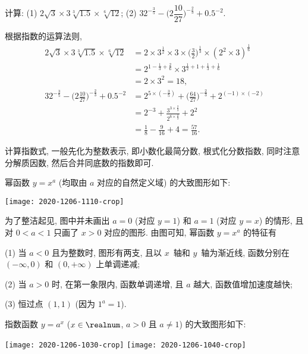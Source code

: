 \begin{example}
    计算: 
    (1) $2\sqrt{3}\times 3\sqrt[3]{1.5}\times \sqrt[6]{12}$;\qquad
    (2) $32^{-\frac35}- \biggl(2\dfrac{10}{27}\biggr)^{-\frac23}+ 0.5^{-2}$.
\end{example}
\begin{solution}
    根据指数的运算法则,
    \[\begin{aligned}
        2\sqrt{3}\times 3\sqrt[3]{1.5}\times \sqrt[6]{12}
        &= 2\times 3^{\frac12}\times 3\times 
            \biggl(\frac32\biggr)^{\frac13}\times
            (2^2\times 3)^{\frac16}\\
        &= 2^{1-\frac13+\frac26}\times 3^{\frac12+1+\frac13+\frac16}\\
        &= 2\times 3^2= 18,\\
        32^{-\frac35}- \biggl(2\frac{10}{27}\biggr)^{-\frac23}+ 0.5^{-2}
        &= 2^{5\times(-\frac35)}+ \biggl(\frac{64}{27}\biggr)^{-\frac23}+ 2^{(-1)\times(-2)}\\
        &= 2^{-3}+ \frac{3^{3\times\frac23}}{2^{6\times\frac23}}+ 2^2\\
        &= \frac18- \frac9{16}+ 4= \frac{57}{16}.
    \end{aligned}\]
\end{solution}

计算指数式, 一般先化为整数表示, 即小数化最简分数, 根式化分数指数, 同时注意分解质因数, 然后合并同底数的指数即可.

幂函数 $y= x^a$ (均取由 $a$ 对应的自然定义域) 的大致图形如下:

    \begin{center}
        \texttt{[image: 2020-1206-1110-crop]}
    \end{center}

为了整洁起见, 图中并未画出 $a=0$ (对应 $y=1$) 和 $a=1$ (对应 $y=x$) 的情形, 且对 $0<a<1$ 只画了 $x>0$ 对应的图形. 由图可知, 幂函数 $y= x^a$ 的特征有

(1) 当 $a<0$ 且为整数时, 图形有两支, 且以 $x$~轴和 $y$~轴为渐近线, 函数分别在 $(-\infty,0)$ 和 $(0,+\infty)$ 上单调递减; 

(2) 当 $a>0$ 时, 在第一象限内, 函数单调递增, 且 $a$ 越大, 函数值增加速度越快;
 
(3) 恒过点 $(1,1)$ (因为 $1^a=1$).

指数函数 $y= a^x$ ($x\in\realnum$, $a>0$ 且 $a\neq 1$) 的大致图形如下:

    \begin{center}
        \texttt{[image: 2020-1206-1030-crop]}\qquad
        \texttt{[image: 2020-1206-1040-crop]}
    \end{center}


